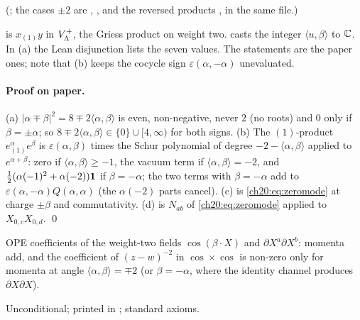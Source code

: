(; the cases $\pm2$ are
, , and the reversed products
,  in the same file.)
\begin{dictionary}
 is $x_{(1)}y$ in $V_{\Lambda}^{+}$, the Griess product on weight two.  
casts the integer $\langle u,\beta\rangle$ to ${\mathbb{C}}$.  In (a) the Lean disjunction lists the seven values.  The statements
are the paper ones; note that (b) keeps the cocycle sign $\varepsilon(\alpha,-\alpha)$ unevaluated.
\end{dictionary}
\paragraph{Proof on paper.}  (a) $|\alpha\mp\beta|^2=8\mp2\langle\alpha,\beta\rangle$ is even, non-negative, never $2$ (no
roots) and $0$ only if $\beta=\pm\alpha$; so $8\mp2\langle\alpha,\beta\rangle\in\{0\}\cup[4,\infty)$ for both signs.  (b) The
$(1)$-product $e^{\alpha}_{(1)}e^{\beta}$ is $\varepsilon(\alpha,\beta)$ times the Schur polynomial of degree
$-2-\langle\alpha,\beta\rangle$ applied to $e^{\alpha+\beta}$: zero if $\langle\alpha,\beta\rangle\ge-1$, the vacuum term if
$\langle\alpha,\beta\rangle=-2$, and $\tfrac12(\alpha(-1)^2+\alpha(-2))\mathbf 1$ if $\beta=-\alpha$; the two terms with $\beta=-\alpha$ add
to $\varepsilon(\alpha,-\alpha)Q(\alpha,\alpha)$ (the $\alpha(-2)$ parts cancel).  (c) is \eqref{ch20:eq:zeromode} at charge $\pm\beta$ and
commutativity.  (d) is $N_{ab}$ of \eqref{ch20:eq:zeromode} applied to $X_{0,c}X_{0,d}$. \qed
\begin{physics}
OPE coefficients of the weight-two fields $\cos(\beta\cdot X)$ and $\partial X^a\partial X^b$: momenta add, and the
coefficient of $(z-w)^{-2}$ in $\cos\times\cos$ is non-zero only for momenta at angle $\langle\alpha,\beta\rangle=\mp2$ (or
$\beta=-\alpha$, where the identity channel produces $\partial X\partial X$).
\end{physics}
\begin{status}
Unconditional; printed in ; standard axioms.
\end{status}

